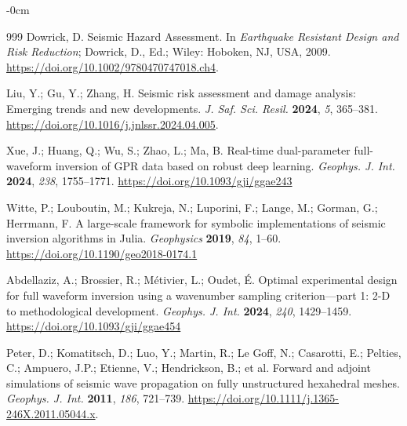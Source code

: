 \documentclass[data,article,accept,pdftex,moreauthors]{Definitions/mdpi}
\begin{document}
\begin{adjustwidth}{-\extralength}{0cm}
\begin{thebibliography}{999}
Dowrick, D. Seismic Hazard Assessment. In \emph{Earthquake Resistant Design and Risk Reduction}; Dowrick, D., Ed.; Wiley: Hoboken, NJ, USA, %
 2009. \url{https://doi.org/10.1002/9780470747018.ch4}.

Liu, Y.; Gu, Y.; Zhang, H. Seismic risk assessment and damage analysis: Emerging trends and new developments. \emph{J. Saf. Sci. Resil.} \textbf{2024}, \emph{5}, 365--381. \url{https://doi.org/10.1016/j.jnlssr.2024.04.005}.

Xue, J.; Huang, Q.; Wu, S.; Zhao, L.; Ma, B. Real-time dual-parameter full-waveform inversion of GPR data based on robust deep learning. \emph{Geophys. J. Int.} \textbf{2024}, \emph{238}, 1755--1771. \url{https://doi.org/10.1093/gji/ggae243}

Witte, P.; Louboutin, M.; Kukreja, N.; Luporini, F.; Lange, M.; Gorman, G.; Herrmann, F. A large-scale framework for symbolic implementations of seismic inversion algorithms in Julia. \emph{Geophysics} \textbf{2019}, \emph{84}, 1--60. \url{https://doi.org/10.1190/geo2018-0174.1}

Abdellaziz, A.; Brossier, R.; M{\'e}tivier, L.; Oudet, {\'E}. Optimal experimental design for full waveform inversion using a wavenumber sampling criterion---part 1: 2-D to methodological development. \emph{Geophys. J. Int.} \textbf{2024}, \emph{240}, 1429--1459. \url{https://doi.org/10.1093/gji/ggae454}

Peter, D.; Komatitsch, D.; Luo, Y.; Martin, R.; Le Goff, N.; Casarotti, E.; Pelties, C.; Ampuero, J.P.; Etienne, V.; Hendrickson, B.; et al. Forward and adjoint simulations of seismic wave propagation on fully unstructured hexahedral meshes. \emph{Geophys. J. Int.} \textbf{2011}, \emph{186}, 721--739. \url{https://doi.org/10.1111/j.1365-246X.2011.05044.x}.


\end{thebibliography}
\end{adjustwidth}
\end{document}

